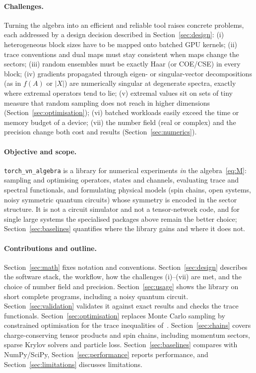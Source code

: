 \documentclass[11pt]{article}
\begin{document}
\paragraph{Challenges.} Turning the algebra into an efficient and reliable tool raises concrete problems, each
addressed by a design decision described in Section~\ref{sec:design}: (i) heterogeneous block sizes have to be
mapped onto batched GPU kernels; (ii) trace conventions and dual maps must stay consistent when maps change the
sectors; (iii) random ensembles must be exactly Haar (or COE/CSE) in every block; (iv) gradients propagated through
eigen- or singular-vector decompositions (as in $f(A)$ or $|X|$) are numerically singular at degenerate spectra,
exactly where extremal operators tend to lie; (v) extremal
values sit on sets of tiny measure that random sampling does not reach in higher dimensions
(Section~\ref{sec:optimisation}); (vi) batched workloads easily exceed the time or memory budget of a device;
(vii) the number field (real or complex) and the precision change both cost and results
(Section~\ref{sec:numerics}).

\paragraph{Objective and scope.} \texttt{torch\_vn\_algebra} is a library for numerical experiments \emph{in}
the algebra~\eqref{eq:M}: sampling and optimising operators, states and channels, evaluating trace and spectral
functionals, and formulating physical models (spin chains, open systems, noisy symmetric quantum circuits) whose
symmetry is encoded in the sector structure. It is not a circuit simulator and not a tensor-network code, and for
single large systems the specialised packages above remain the better choice; Section~\ref{sec:baselines}
quantifies where the library gains and where it does not.

\paragraph{Contributions and outline.} Section~\ref{sec:math} fixes notation and conventions. Section~\ref{sec:design}
describes the software stack, the workflow, how the challenges (i)--(vii) are met, and the choice of number field and
precision. Section~\ref{sec:usage} shows the library on short complete programs, including a noisy quantum circuit.
Section~\ref{sec:validation} validates it against exact results and checks the trace functionals.
Section~\ref{sec:optimisation} replaces Monte Carlo sampling by constrained optimisation for the trace inequalities
of~\cite{v1}. Section~\ref{sec:chains} covers charge-conserving tensor products and spin chains, including momentum
sectors, sparse Krylov solvers and particle loss. Section~\ref{sec:baselines} compares with NumPy/SciPy,
Section~\ref{sec:performance} reports performance, and Section~\ref{sec:limitations} discusses limitations.
\end{document}
